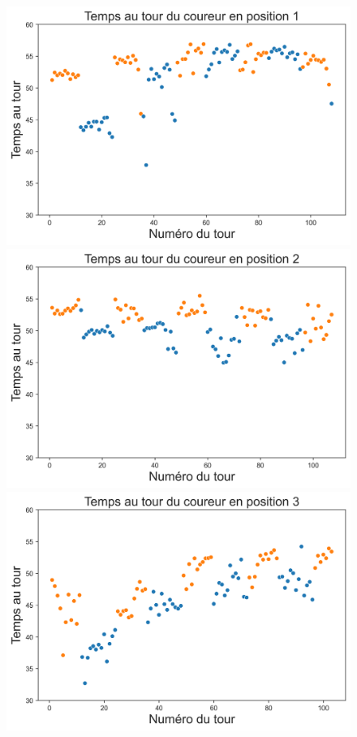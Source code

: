 \documentclass[a4paper,12pt]{article}
\begin{document}
\begin{figure}[!h]
	\centering
		\includegraphics[scale=0.45]{tempstour1}
		\includegraphics[scale=0.45]{tempstour2}
		\includegraphics[scale=0.45]{tempstour3}

\end{figure}
\end{document}
